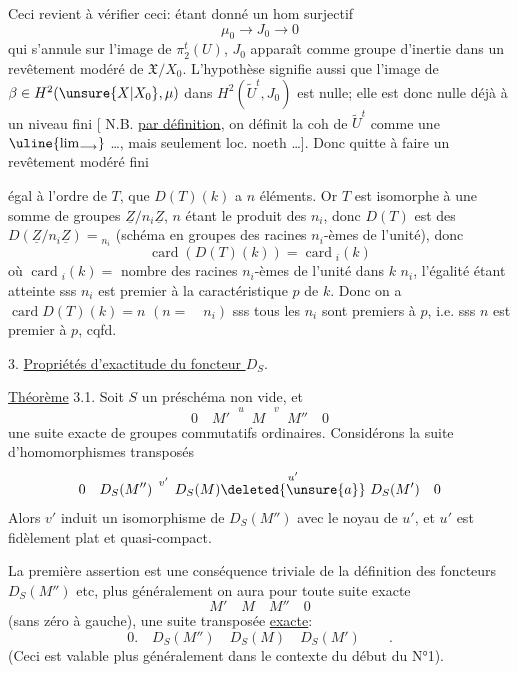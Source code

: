 Ceci revient à vérifier ceci: étant donné un hom surjectif
\[
 \mu_0\longrightarrow J_0\longrightarrow0
\]
qui s'annule sur l'image de $\pi_2^t(U)$,
 $J_0$ apparaît comme groupe d'inertie dans
un revêtement  modéré de $\mathfrak X/X_0$.
L'hypothèse signifie aussi que l'image de
$\beta\in H^2(\unsure{X|X_0},\mu)$ dans $H^2(\widetilde U^t,J_0)$
est nulle; elle est donc nulle déjà  à un
niveau fini [ N.B. \uline{par définition}, on définit la coh de
$\widetilde U^t$ comme une $\uline{\lim_{\longrightarrow}}$ \ldots,
  
mais seulement loc. noeth \ldots ]. Donc quitte à faire
un revêtement modéré fini

 égal à l'ordre de $T$, que $D(T)(k)$ a
 $n$ éléments. Or $T$ est isomorphe
à une somme de groupes $\underline Z/n_i\underline Z$, $n$ étant le
produit des $n_i$, donc $D(T)$ est 
 des $D(\underline Z/n_i\underline Z)={}_{n_i}$
(schéma en groupes des racines $n_i$-èmes de l'unité), donc
\[
 \operatorname{card}(D(T)(k))=\operatorname{card}{}_{i}(k)
\]
où $\operatorname{card}{}_{i}(k)=$ nombre des racines $n_i$-èmes de
l'unité dans $k$ \quad $n_i$, l'égalité étant atteinte sss $n_i$
est premier à la caractéristique $p$ de $k$. Donc on a
$\operatorname{card}D(T)(k)=n$
$(n=\quad n_i)$ sss tous les $n_i$ sont premiers à $p$, i.e. sss
$n$ est premier à $p$, cqfd.

3. \uline{Propriétés d'exactitude du foncteur $D_S$}.

\uline{Théorème} 3.1. Soit $S$ un préschéma non vide,
 et
\[
 0\quad M'\overset{u}{\phantom{\longrightarrow}}M
 \overset{v}{\phantom{\longrightarrow}}M''\quad0
\]
une suite exacte de groupes commutatifs ordinaires. Considérons
la suite d'homomorphismes transposés
\[
 0\quad D_S(M'')\overset{v'}{\phantom{\longrightarrow}}D_S(M)
 \overset{u'}{\deleted{\unsure{a}}}\ D_S(M')\quad0
\]
Alors $v'$ induit un isomorphisme de  $D_S(M'')$
avec le noyau de $u'$, et $u'$ est fidèlement plat et quasi-compact.

La première assertion est une conséquence triviale de la définition
des foncteurs $D_S(M'')$ etc, plus généralement on aura pour toute
suite exacte
\[
 M'\quad M\quad M''\quad0
\]
(sans zéro à gauche), une suite transposée \uline{exacte}:
\[
 0.\quad D_S(M'')\quad D_S(M)\quad D_S(M')\qquad.
\]
(Ceci est valable plus généralement dans le contexte du début du N°1).

